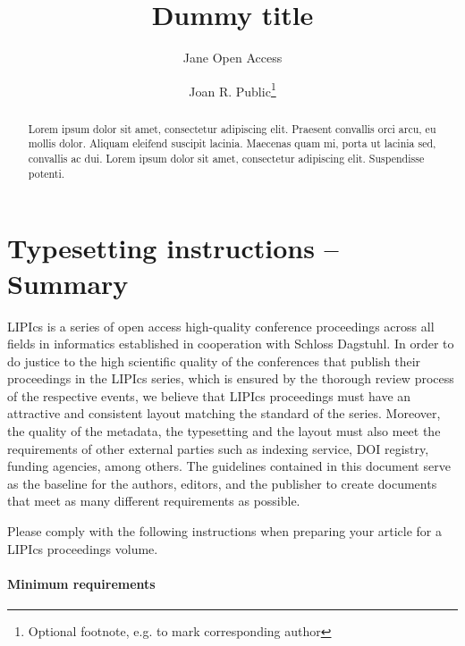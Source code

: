 \documentclass[a4paper,UKenglish,cleveref, autoref, thm-restate]{lipics-v2021}
\title{Dummy title} %
\author{Jane {Open Access}}{Dummy University Computing Laboratory, [optional: Address], Country \and My second affiliation, Country \and \url{http://www.myhomepage.edu} }{johnqpublic@dummyuni.org}{https://orcid.org/0000-0002-1825-0097}{(Optional) author-specific funding acknowledgements}%
\author{Joan R. Public\footnote{Optional footnote, e.g. to mark corresponding author}}{Department of Informatics, Dummy College, [optional: Address], Country}{joanrpublic@dummycollege.org}{[orcid]}{[funding]}
\begin{document}
\maketitle

\begin{abstract}
Lorem ipsum dolor sit amet, consectetur adipiscing elit. Praesent convallis orci arcu, eu mollis dolor. Aliquam eleifend suscipit lacinia. Maecenas quam mi, porta ut lacinia sed, convallis ac dui. Lorem ipsum dolor sit amet, consectetur adipiscing elit. Suspendisse potenti. 
\end{abstract}

\section{Typesetting instructions -- Summary}
\label{sec:typesetting-summary}

LIPIcs is a series of open access high-quality conference proceedings across all fields in informatics established in cooperation with Schloss Dagstuhl. 
In order to do justice to the high scientific quality of the conferences that publish their proceedings in the LIPIcs series, which is ensured by the thorough review process of the respective events, we believe that LIPIcs proceedings must have an attractive and consistent layout matching the standard of the series.
Moreover, the quality of the metadata, the typesetting and the layout must also meet the requirements of other external parties such as indexing service, DOI registry, funding agencies, among others. The guidelines contained in this document serve as the baseline for the authors, editors, and the publisher to create documents that meet as many different requirements as possible. 

Please comply with the following instructions when preparing your article for a LIPIcs proceedings volume. 
\paragraph*{Minimum requirements}
\end{document}
